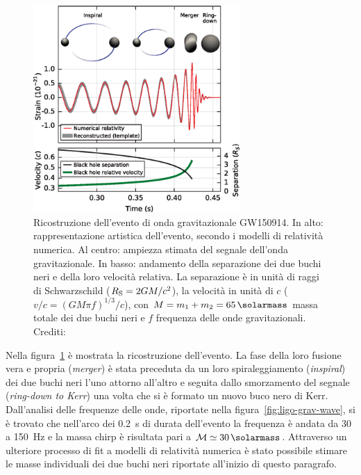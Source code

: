 \begin{figure}[tb]
  \centering
  \includegraphics[width=0.7\textwidth]{figure/ligo-estim-strain}
  \caption{Ricostruzione dell'evento di onda gravitazionale GW150914.  In alto:
    rappresentazione artistica dell'evento, secondo i modelli di relatività
    numerica.  Al centro: ampiezza stimata del segnale dell'onda gravitazionale.
    In basso: andamento della separazione dei due buchi neri e della loro
    velocità relativa.  La separazione è in unità di raggi di Schwarzschild
    (\(R_{\textup{S}} = 2GM/c^{2}\)), la velocità in unità di \(c\)
    (\(v/c=(GM\pi f)^{1/3}/c\)), con \(M = m_{1} + m_{2} = \SI{65}{\solarmass}\)
    massa totale dei due buchi neri e \(f\) frequenza delle onde
    gravitazionali.  Crediti:~\textcite{2016PhRvL.116f1102A}}
  \label{fig:ligo-strain}
\end{figure}
Nella figura~\ref{fig:ligo-strain} è mostrata la ricostruzione dell'evento.  La
fase della loro fusione vera e propria (\emph{merger}) è stata preceduta da un
loro spiraleggiamento (\emph{inspiral}) dei due buchi neri l'uno attorno
all'altro e seguita dallo smorzamento del segnale (\emph{ring-down to Kerr}) una
volta che si è formato un nuovo buco nero di Kerr.  Dall'analisi delle frequenze
delle onde, riportate nella figura~\ref{fig:ligo-grav-wave}, si è trovato che
nell'arco dei \SI{0.2}{\second} di durata dell'evento la frequenza è andata da
\num{30} a \SI{150}{\hertz} e la massa chirp è risultata pari a
\(\mathcal{M} \simeq \SI{30}{\solarmass}\).  Attraverso un ulteriore processo di
fit a modelli di relatività numerica è stato possibile stimare le masse
individuali dei due buchi neri riportate all'inizio di questo paragrafo.

